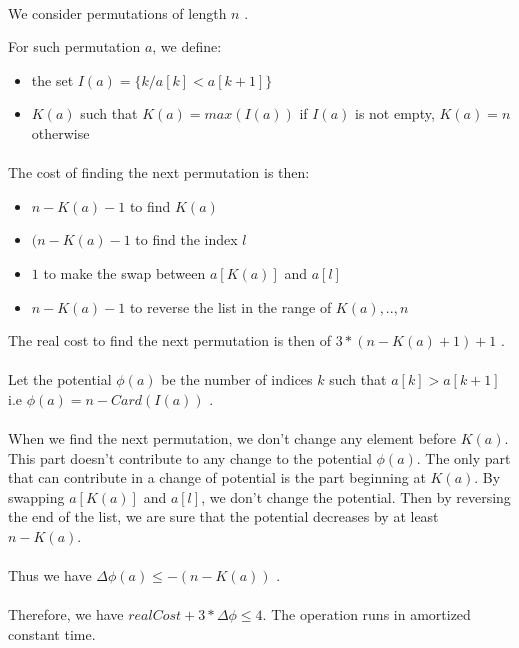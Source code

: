 

\paragraph{}
We consider permutations of length $n$ .

For such permutation $a$, we define:
\begin{itemize}
\item{} the set $I(a)=\{k/ a[k]<a[k+1]\}$
\item{} $K(a)$ such that $K(a)= max(I(a))$ if $I(a)$ is not empty, $K(a)=n$ otherwise
\end{itemize}

\paragraph{}
The cost of finding the next permutation is then:
\begin{itemize}
\item{} $n-K(a)-1$ to find $K(a)$
\item{} $(n-K(a)-1$ to find the index $l$
\item{} $1$ to make the swap between $a[K(a)]$ and $a[l]$
\item{} $n-K(a)-1$ to reverse the list in the range of $K(a),..,n$
\end{itemize}
The real cost to find the next permutation is then of $3*(n-K(a)+1)+1$ .

\paragraph{}
\paragraph{}
Let the potential $\phi(a)$ be the number of indices $k$ such that $a[k]>a[k+1]$ i.e $\phi(a)=n-Card(I(a))$ .

\paragraph{}
When we find the next permutation, we don't change any element before $K(a)$. This part doesn't contribute to any change to the potential $\phi(a)$. The only part that can contribute in a change of potential is the part beginning at $K(a)$. By swapping $a[K(a)]$ and $a[l]$, we don't change the potential. Then by reversing the end of the list, we are sure that the potential decreases by at least $n-K(a)$.
\paragraph{}
Thus we have $\Delta\phi(a)\leq{-(n-K(a))}$ .

\paragraph{}
\paragraph{}
Therefore, we have $realCost+3*\Delta\phi\leq{4}$. The operation runs in amortized constant time.